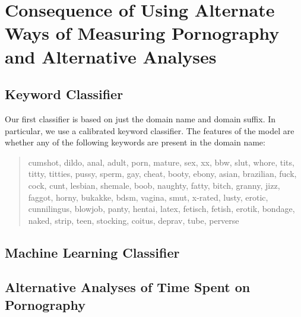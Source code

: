\documentclass[12pt, letterpaper]{article}
\begin{document}
\FloatBarrier
\section{Consequence of Using Alternate Ways of Measuring Pornography and Alternative Analyses}
\subsection{Keyword Classifier}
Our first classifier is based on just the domain name and domain suffix. In particular, we use a calibrated keyword classifier. The features of the model are whether any of the following keywords are present in the domain name:

\begin{quote}

cumshot, dildo, anal, adult, porn, mature, sex, xx, bbw, slut, whore, tits, titty, titties, pussy, sperm, gay, cheat, booty, ebony, asian, brazilian, fuck, cock, cunt, lesbian, shemale, boob, naughty, fatty, bitch, granny, jizz, faggot, horny, bukakke, bdsm, vagina, smut, x-rated, lusty, erotic, cunnilingus, blowjob, panty, hentai, latex, fetisch, fetish, erotik, bondage, naked, strip, teen, stocking, coitus, deprav, tube, perverse 

\end{quote}
\subsection{Machine Learning Classifier}


\subsection{Alternative Analyses of Time Spent on Pornography}
\end{document}
